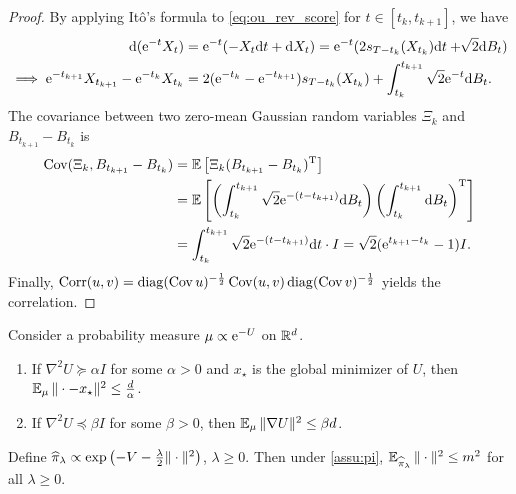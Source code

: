 \begin{proof}
    By applying It\^o's formula to \cref{eq:ou_rev_score} for $t\in[t_k,t_{k+1}]$, we have
    \begin{align*}
        \mathrm{d}(\mathrm{e}^{-t}X_t)&=\mathrm{e}^{-t}(-X_t\mathrm{d} t+\mathrm{d} X_t)=\mathrm{e}^{-t}(2s_{T-t_k}(X_{t_k})\mathrm{d} t+\sqrt[]{2}\mathrm{d} B_t)\\
        \implies\mathrm{e}^{-t_{k+1}}X_{t_{k+1}}-\mathrm{e}^{-t_k}X_{t_k}&=2(\mathrm{e}^{-t_k}-\mathrm{e}^{-t_{k+1}})s_{T-t_k}(X_{t_k})+\int_{t_k}^{t_{k+1}}\sqrt{2}\mathrm{e}^{-t}\mathrm{d} B_t.
    \end{align*}
    The covariance between two zero-mean Gaussian random variables $\Xi_k$ and $B_{t_{k+1}}-B_{t_k}$ is
    \begin{align*}
        \operatorname{Cov}(\Xi_k,B_{t_{k+1}}-B_{t_k})&=\operatorname{\mathbb{E}}\left[\Xi_k(B_{t_{k+1}}-B_{t_k})^\mathrm{T}\right]\\
        &=\operatorname{\mathbb{E}}\left[\left(\int_{t_k}^{t_{k+1}}\sqrt{2}\mathrm{e}^{-(t-t_{k+1})}\mathrm{d} B_t\right)\left(\int_{t_k}^{t_{k+1}}\mathrm{d} B_t\right)^\mathrm{T}\right]\\
        &=\int_{t_k}^{t_{k+1}}\sqrt{2}\mathrm{e}^{-(t-t_{k+1})}\mathrm{d} t\cdot I=\sqrt{2}(\mathrm{e}^{t_{k+1}-t_k}-1)I.
    \end{align*}
    Finally, $\operatorname{Corr}(u,v)=\operatorname{diag}(\operatorname{Cov} u)^{-\frac12}\operatorname{Cov}(u,v)\operatorname{diag}(\operatorname{Cov} v)^{-\frac12}$ yields the correlation.
\end{proof}

\begin{lemma}
    Consider a probability measure $\mu\propto\mathrm{e}^{-U}$ on $\mathbb{R}^d$. 
    \begin{enumerate}[wide=0pt,itemsep=0pt, topsep=0pt,parsep=0pt,partopsep=0pt]
        \item If $\nabla^2U\succeq \alpha I$ for some $\alpha>0$ and $x_\star$ is the global minimizer of $U$, then $\operatorname{\mathbb{E}}_{\mu}{\|\cdot-x_\star\|^2}\le\frac{d}{\alpha}$.
        \item If $\nabla^2U\preceq \beta I$ for some $\beta>0$, then $\operatorname{\mathbb{E}}_{\mu}{\|\nabla U\|^2}\le\beta d$.
    \end{enumerate}
    \label{lem:2ordmomlogccv}
\end{lemma}

\begin{lemma}
    Define $\widehat{\pi}_\lambda\propto\exp\left(-V-\frac{\lambda}{2}\|\cdot\|^2\right)$, $\lambda\ge0$. Then under \cref{assu:pi}, $\operatorname{\mathbb{E}}_{\widehat{\pi}_\lambda}{\|\cdot\|^2}\le m^2$ for all $\lambda\ge0$.%
    \label{lem:2ordmom}
\end{lemma}

